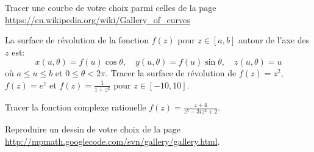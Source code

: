 \begin{exercice}
Tracer une courbe de votre choix parmi celles de la page
\url{https://en.wikipedia.org/wiki/Gallery_of_curves}
\end{exercice}



\begin{exercice}
La surface de révolution de la fonction $f(z)$ pour $z\in[a,b]$ autour de
l'axe des $z$ est:
\[
    x(u, \theta) = f(u)\cos\theta,\quad
    y(u, \theta) = f(u)\sin\theta,\quad
    z(u, \theta) = u
\]
où $a\leq u\leq b$ et $0\leq\theta < 2\pi$. Tracer la surface de révolution de
$f(z)=z^2$, $f(z)=e^z$ et $f(z)=\frac{1}{1+z^2}$ pour $z\in[-10,10]$.
\end{exercice}

\begin{exercice}
Tracer la fonction complexe rationelle
$\displaystyle f(z)= \frac{z+4}{z^5-3iz^3+2}$.
\end{exercice}


\begin{exercice}
Reproduire un dessin de votre choix de la page
\url{http://mpmath.googlecode.com/svn/gallery/gallery.html}.
\end{exercice}
